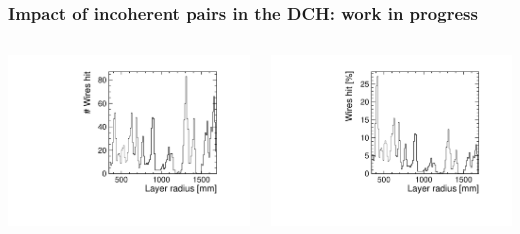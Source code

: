 \documentclass[aspectratio=169, hyperref={colorlinks=true,pdfpagelabels=false,linkcolor=black}, xcolor=dvipsnames,10pt]{beamer}
\begin{document}
\begin{frame}
	\frametitle{Impact of incoherent pairs in the DCH: work in progress}



	\begin{columns}
	\centering
	\includegraphics[width=\textwidth]{../figures/layerR_vs_wires.pdf}

	\centering
	\includegraphics[width=\textwidth]{../figures/layerR_vs_wires_percent.pdf}	
	
	\end{columns}
	
\end{frame}
\end{document}
